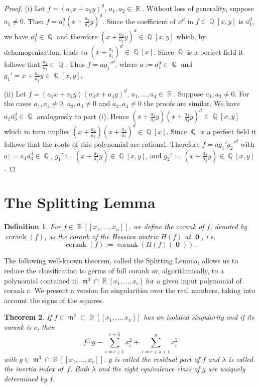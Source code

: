 \documentclass[noend]{amsproc}
\newtheorem{theorem}{Theorem}
\newtheorem{defn}[theorem]{Definition}
\theoremstyle{definition}
\newcommand{\requiv}{\ensuremath{\mathrel{\overset{r}{\sim}}}}
\DeclareMathOperator{\m}{\mathfrak{m}}
\DeclareMathOperator{\corank}{corank}
\DeclareMathOperator{\Q}{\mathbb{Q}}
\DeclareMathOperator{\R}{\mathbb{R}}
\DeclareMathOperator{\boldzero}{\mathbf{0}}
\begin{document}
\begin{proof}

(i) Let $f = (a_1x+a_2y)^d$, $a_1, a_2 \in \R$. Without loss of generality,
suppose $a_1 \neq 0$. Then $f = a_1^d(x+\frac{a_2}{a_1}y)^d$. Since the
coefficient of $x^d$ in $f \in \Q[x,y]$ is $a_1^d$, we have $a_1^d \in \Q$ and
therefore $(x+\frac{a_2}{a_1}y)^d \in \Q[x,y]$ which, by dehomogenization,
leads to $(x+\frac{a_2}{a_1})^d \in \Q[x]$. Since $\Q$ is a perfect field it
follows that $\frac{a_2}{a_1} \in \Q$. Thus $f = ag_1'^d$, where
$a := a_1^d \in \Q$ and $g_1' = x+\frac{a_2}{a_1}y \in \Q[x,y]$.

(ii) Let $f = (a_1x+a_2y)(a_3x+a_4y)^d$, $a_1,\ldots,a_4 \in \R$. Suppose
$a_1,a_3 \neq 0$. For the cases $a_1,a_4 \neq 0$, $a_2,a_3 \neq 0$ and
$a_2,a_4 \neq 0$ the proofs are similar. We have $a_1a_3^d \in \Q$ analogously
to part (i). Hence $(x+\frac{a_2}{a_1}y)(x+\frac{a_4}{a_3}y)^d \in \Q[x,y]$
which in turn implies $(x+\frac{a_2}{a_1})(x+\frac{a_4}{a_3})^d \in \Q[x]$.
Since $\Q$ is a perfect field it follows that the roots of this polynomial are
rational. Therefore $f = ag_1'g_2'^d$ with $a: = a_1a_3^d \in \Q$,
$g_1' := (x+\frac{a_2}{a_1}y) \in \Q[x,y]$, and
$g_2' := (x+\frac{a_4}{a_3}y) \in \Q[x,y]$.
\end{proof}


\section{The Splitting Lemma}%
\label{sec:splitting_lemma}

\begin{defn}
For $f \in \R[[x_1,\ldots,x_n]]$, we define the corank of $f$, denoted by
$\corank(f)$, as the corank of the Hessian matrix $H(f)$ at $\boldzero$, i.e.
\[
\corank(f) := \corank(H(f)(\boldzero)) \,.
\]
\end{defn}

The following well-known theorem, called the Splitting Lemma, allows us to
reduce the classification to germs of full corank or, algorithmically, to
a polynomial contained in $\m^3 \cap \R[x_1,\ldots,x_c]$ for a given input
polynomial of corank $c$. We present a version for singularities over the real
numbers, taking into account the signs of the squares.

\begin{theorem}\label{thm:splitting_lemma}
If $f \in \m^2 \subset \R[[x_1,\ldots,x_n]]$ has an isolated singularity and if
its corank is $c$, then
\[
f \requiv g -\sum_{i=c+1}^{c+\lambda} x_i^2 +\sum_{i=c+\lambda+1}^n x_i^2
\]
with $g \in \m^3 \cap \R[[x_1,\ldots,x_c]]$. $g$ is called the residual part of
$f$ and $\lambda$ is called the inertia index of~$f$. Both $\lambda$ and the
right equivalence class of $g$ are uniquely determined by $f$.
\end{theorem}
\end{document}
